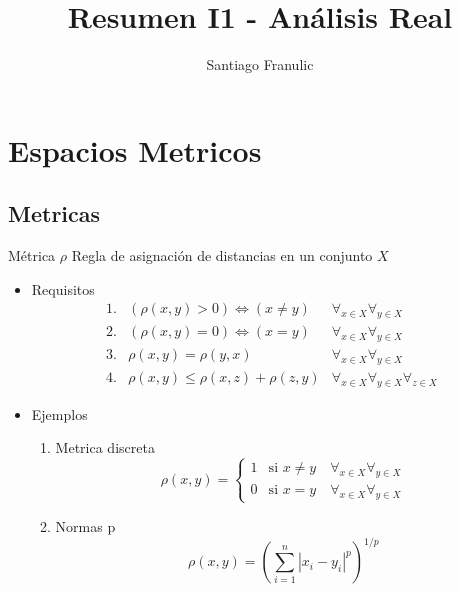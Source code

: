 \documentclass[a4paper,11pt]{article}
\title{\textbf{\color{maincolor}Resumen I1 - Análisis Real}}
\author{Santiago Franulic}
\date{}
\begin{document}
\maketitle
\tableofcontents
\newpage

\section{Espacios Metricos}

\subsection{Metricas}

\begin{definicion*}{Métrica $\rho$}{}
  Regla de asignación de distancias en un conjunto $X$
  \begin{itemize}
    \item Requisitos
    \[
    \begin{array}{lll}
      1. & (\rho(x,y) > 0) \Leftrightarrow (x \neq y) & \forall_{x \in X}\forall_{y \in X} \\
      2. & (\rho(x,y) = 0) \Leftrightarrow (x = y) & \forall_{x \in X}\forall_{y \in X} \\
      3. & \rho(x,y) = \rho(y,x) & \forall_{x \in X}\forall_{y \in X} \\
      4. & \rho(x,y) \leq \rho(x,z) + \rho(z,y) & \forall_{x \in X}\forall_{y \in X}\forall_{z \in X}
    \end{array}
    \]
    \item Ejemplos
    \begin{enumerate}
        \item Metrica discreta
        \begin{equation*}
            \rho(x,y) = \begin{cases}
                1 & \text{si } x \neq y \quad \forall_{x \in X}\forall_{y \in X} \\
                0 & \text{si } x = y \quad \forall_{x \in X}\forall_{y \in X}
            \end{cases}
        \end{equation*}
        \item Normas p
        \begin{equation*}
            \rho(x,y) = \left( \sum_{i=1}^{n} |x_i - y_i|^p \right)^{1/p}
        \end{equation*}
    \end{enumerate}
  \end{itemize}
\end{definicion*}
\end{document}
